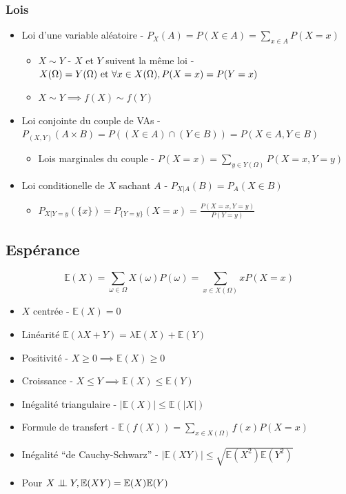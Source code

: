 \documentclass[openany]{book}
\begin{document}
\subsubsection{Lois}
\begin{itemize}
    \item Loi d'une variable aléatoire - $P_X(A) = P(X \in A) = \sum_{x \in A} P(X = x)$
    \begin{itemize}
        \item $X \sim Y$ - $X$ et $Y$ suivent la même loi - $X(\Omega) = Y(\Omega) \text{ et } \forall x \in X(\Omega), P(X=x)=P(Y=x)$
        \item $X \sim Y \implies f(X) \sim f(Y)$
    \end{itemize}
    \item Loi conjointe du couple de VAs - $P_{(X, Y)}(A \times B) = P((X \in A) \cap (Y \in B)) = P(X \in A, Y \in B)$
    \begin{itemize}
        \item Lois marginales du couple - $P(X = x) = \sum_{y \in Y(\Omega)} P(X = x, Y=y)$
    \end{itemize}
    \item Loi conditionelle de $X$ sachant $A$ - $P_{X|A}(B) = P_A(X \in B)$
    \begin{itemize}
        \item $P_{X|Y=y}(\{x\}) = P_{\{Y=y\}}(X=x) = \frac{P(X=x,Y=y)}{P(Y=y)}$
    \end{itemize}
\end{itemize}

\subsection{Espérance}
\[ \mathbb{E}(X) = \sum_{\omega \in \Omega} X(\omega)P({\omega}) = \sum_{x \in X(\Omega)} xP(X=x) \]

\begin{itemize}
    \item $X$ centrée - $\mathbb{E}(X) = 0$
    \item Linéarité $\mathbb{E}(\lambda X + Y) = \lambda \mathbb{E}(X) + \mathbb{E}(Y)$
    \item Positivité - $X \geq 0 \implies \mathbb{E}(X) \geq 0$
    \item Croissance - $X \leq Y \implies \mathbb{E}(X) \leq \mathbb{E}(Y)$
    \item Inégalité triangulaire - $|\mathbb{E}(X)| \leq \mathbb{E}(|X|)$
    \item Formule de transfert - $\mathbb{E}(f(X)) = \sum_{x\in X(\Omega)} f(x)P(X=x)$
    \item Inégalité ``de Cauchy-Schwarz'' - $|\mathbb{E}(XY)| \leq \sqrt{\mathbb{E}(X^2)\mathbb{E}(Y^2)}$
    \item Pour $X \perp\!\!\!\perp Y, \mathbb{E}(XY) = \mathbb{E}(X)\mathbb{E}(Y)$
\end{itemize}
\end{document}
